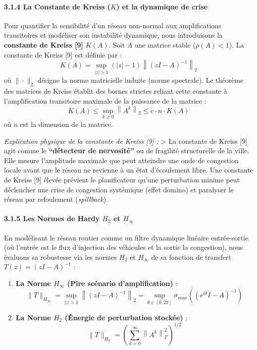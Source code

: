 \documentclass[10pt, a4paper]{article}
\providecommand{\tightlist}{}
\begin{document}
\paragraph{\texorpdfstring{3.1.4 La Constante de Kreiss (\(K\)) et la
dynamique de
crise}{3.1.4 La Constante de Kreiss (K) et la dynamique de crise}}\label{la-constante-de-kreiss-k-et-la-dynamique-de-crise}

Pour quantifier la sensibilité d'un réseau non-normal aux amplifications
transitoires et modéliser son instabilité dynamique, nous introduisons
la \textbf{constante de Kreiss {[}9{]}} \(K(A)\). Soit \(A\) une matrice
stable (\(\rho(A) < 1\)). La constante de Kreiss {[}9{]} est définie par
: \[K(A) = \sup_{|z| > 1} (|z| - 1) \left\| (zI - A)^{-1} \right\|_2\]
où \(\|\cdot\|_2\) désigne la norme matricielle induite (norme
spectrale). Le théorème des matrices de Kreiss établit des bornes
strictes reliant cette constante à l'amplification transitoire maximale
de la puissance de la matrice :
\[K(A) \le \sup_{k \ge 0} \left\| A^k \right\|_2 \le e \cdot n \cdot K(A)\]
où \(n\) est la dimension de la matrice.

\emph{Explication physique de la constante de Kreiss {[}9{]} :}
\textgreater{} La constante de Kreiss {[}9{]} agit comme le
\textbf{``détecteur de nervosité''} ou de fragilité structurelle de la
ville. Elle mesure l'amplitude maximale que peut atteindre une onde de
congestion locale avant que le réseau ne revienne à un état d'écoulement
libre. Une constante de Kreiss {[}9{]} élevée prévient le planificateur
qu'une perturbation minime peut déclencher une crise de congestion
systémique (effet domino) et paralyser le réseau par refoulement
(\emph{spillback}).

\paragraph{\texorpdfstring{3.1.5 Les Normes de Hardy \(H_2\) et
\(H_\infty\)}{3.1.5 Les Normes de Hardy H\_2 et H\_\textbackslash infty}}\label{les-normes-de-hardy-h_2-et-h_infty}

En modélisant le réseau routier comme un filtre dynamique linéaire
entrée-sortie (où l'entrée est le flux d'injection des véhicules et la
sortie la congestion), nous évaluons sa robustesse via les normes
\(H_2\) et \(H_\infty\) de sa fonction de transfert
\(T(z) = (zI - A)^{-1}\) :

\begin{enumerate}
\def\labelenumi{\arabic{enumi}.}
\tightlist
\item
  \textbf{La Norme \(H_\infty\) (Pire scénario d'amplification)} :
  \[\|T\|_{H_\infty} = \sup_{|z| > 1} \left\| (zI - A)^{-1} \right\|_2 = \sup_{\theta \in [0, 2\pi]} \sigma_{max}\left( (e^{i\theta}I - A)^{-1} \right)\]
\item
  \textbf{La Norme \(H_2\) (Énergie de perturbation stockée)} :
  \[\|T\|_{H_2} = \left( \sum_{k=0}^{\infty} \left\| A^k \right\|_F^2 \right)^{1/2}\]
\end{enumerate}
\end{document}
